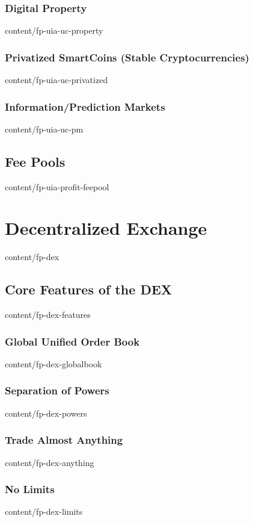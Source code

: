 \documentclass[conference,final,10pt,a4paper]{IEEEtran}
\begin{document}
\subsubsection  { Digital Property                                 }  { content/fp-uia-uc-property     } 
\subsubsection  { Privatized SmartCoins (Stable Cryptocurrencies)  }  { content/fp-uia-uc-privatized   } 
\subsubsection  { Information/Prediction Markets                   }  { content/fp-uia-uc-pm           } 
\subsection     { Fee Pools                                        }  { content/fp-uia-profit-feepool  } 

\section        { Decentralized Exchange                           }  { content/fp-dex                 } 
\subsection     { Core Features of the DEX                         }  { content/fp-dex-features        } 
\subsubsection  { Global Unified Order Book                        }  { content/fp-dex-globalbook      } 
\subsubsection  { Separation of Powers                             }  { content/fp-dex-powers          } 
\subsubsection  { Trade Almost Anything                            }  { content/fp-dex-anything        } 
\subsubsection  { No Limits                                        }  { content/fp-dex-limits          } 
\end{document}

